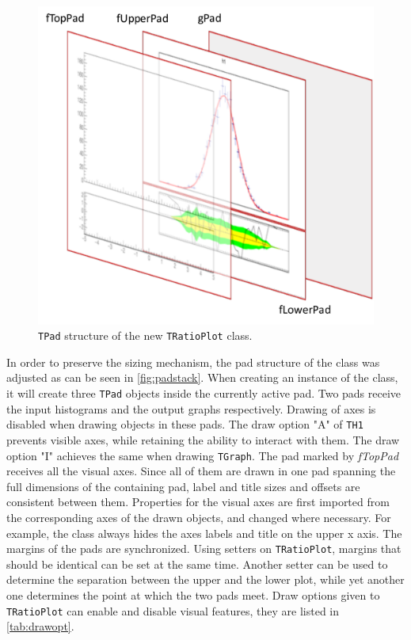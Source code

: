\begin{figure}
  \centering
  \includegraphics[width=1.0\linewidth]{assets/padstack.pdf}
  \caption{\texttt{TPad} structure of the new \texttt{TRatioPlot} class.}
  \label{fig:padstack}
\end{figure}

In order to preserve the sizing mechanism, the pad structure of the class was adjusted as can be seen
in \autoref{fig:padstack}. When creating
an instance of the class, it will create three \texttt{TPad} objects inside the currently active pad.
Two pads receive the input histograms and the output graphs respectively. Drawing of axes is disabled
when drawing objects in these pads. The draw option "A" of \texttt{TH1} prevents visible axes, while
retaining the ability to interact with them. The draw option "I" achieves the same when drawing
\texttt{TGraph}. The pad marked by \emph{fTopPad} receives all the visual axes. Since all of them are drawn
in one pad spanning the full dimensions of the containing pad, label and title sizes and offsets are consistent
between them. Properties for the visual axes are first imported from the corresponding axes of the drawn
objects, and changed where necessary. For example, the class always hides the axes labels and title on the upper x axis. The margins of the pads are synchronized. Using setters on \texttt{TRatioPlot}, margins that
should be identical can be set at the same time. Another setter can be used to determine the separation
between the upper and the lower plot, while yet another one determines the point at which the two pads
meet. Draw options given to \texttt{TRatioPlot} can enable and disable visual features, they are listed
in \autoref{tab:drawopt}.

